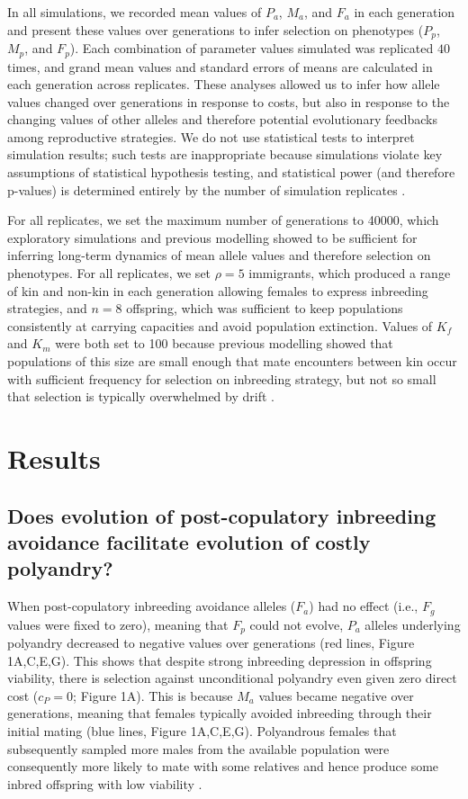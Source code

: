 \documentclass[10pt,letterpaper]{article}
\begin{document}
In all simulations, we recorded mean values of $P_{a}$, $M_{a}$, and $F_{a}$ in each generation and present these values over generations to infer selection on phenotypes ($P_{p}$, $M_{p}$, and $F_{p}$). Each combination of parameter values simulated was replicated $40$ times, and grand mean values and standard errors of means are calculated in each generation across replicates. These analyses allowed us to infer how allele values changed over generations in response to costs, but also in response to the changing values of other alleles and therefore potential evolutionary feedbacks among reproductive strategies. We do not use statistical tests to interpret simulation results; such tests are inappropriate because simulations violate key assumptions of statistical hypothesis testing, and statistical power (and therefore p-values) is determined entirely by the number of simulation replicates \cite[][]{White2014}. 

For all replicates, we set the maximum number of generations to 40000, which exploratory simulations and previous modelling \cite[][]{Duthie} showed to be sufficient for inferring long-term dynamics of mean allele values and therefore selection on phenotypes. For all replicates, we set $\rho=5$ immigrants, which produced a range of kin and non-kin in each generation allowing females to express inbreeding strategies, and $n=8$ offspring, which was sufficient to keep populations consistently at carrying capacities and avoid population extinction. Values of $K_{f}$ and $K_{m}$ were both set to 100 because previous modelling showed that populations of this size are small enough that mate encounters between kin occur with sufficient frequency for selection on inbreeding strategy, but not so small that selection is typically overwhelmed by drift \cite[][]{Duthie2016a}.

\section*{Results}

\subsection*{Does evolution of post-copulatory inbreeding avoidance facilitate evolution of costly polyandry?}

When post-copulatory inbreeding avoidance alleles ($F_{a}$) had no effect (i.e., $F_{g}$ values were fixed to zero), meaning that $F_{p}$ could not evolve, $P_{a}$ alleles underlying polyandry decreased to negative values over generations (red lines, Figure 1A,C,E,G). This shows that despite strong inbreeding depression in offspring viability, there is selection against unconditional polyandry even given zero direct cost ($c_{P}=0$; Figure 1A). This is because $M_{a}$ values became negative over generations, meaning that females typically avoided inbreeding through their initial mating (blue lines, Figure 1A,C,E,G). Polyandrous females that subsequently sampled more males from the available population were consequently more likely to mate with some relatives and hence produce some inbred offspring with low viability \cite[see also][]{Duthie}. 
\end{document}
